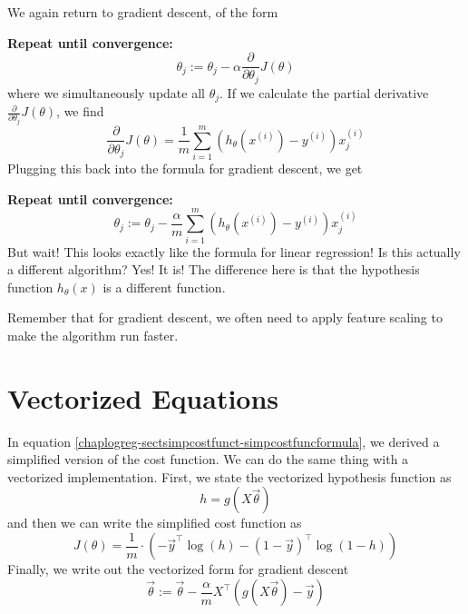 We again return to gradient descent, of the form 


\textbf{Repeat until convergence:}
\begin{equation}
\label{chaplogreg-sectcostfunct-subsectgraddscnt-logreggraddscnt}
\theta_j := \theta_j - \alpha \frac{\partial}{\partial \theta_j} J\left( \theta \right)
\end{equation}
where we simultaneously update all $\theta_j$. If we calculate the partial derivative $\frac{\partial}{\partial \theta_j} J\left(\theta\right)$, we find
\begin{equation}
\frac{\partial}{\partial \theta_j} J\left(\theta\right) = \frac{1}{m}\sum_{i=1}^m \left( h_\theta\left(x^{\left(i\right)}\right) - y^{\left(i\right)}\right) x_j^{\left(i\right)}
\end{equation}
Plugging this back into the formula for gradient descent, we get


\textbf{Repeat until convergence:}
\begin{equation}
\theta_j := \theta_j - \frac{\alpha}{m} \sum_{i=1}^m \left( h_\theta\left(x^{\left(i\right)}\right) - y^{\left(i\right)}\right) x_j^{\left(i\right)}
\end{equation}
But wait! This looks exactly like the formula for linear regression! Is this actually a different algorithm? Yes! It is! The difference here is that the hypothesis function $h_\theta\left(x\right)$ is a different function. 

Remember that for gradient descent, we often need to apply feature scaling to make the algorithm run faster. 


\section{Vectorized Equations}
In equation \ref{chaplogreg-sectsimpcostfunct-simpcostfuncformula}, we derived a simplified version of the cost function. We can do the same thing with a vectorized implementation. First, we state the vectorized hypothesis function as
\begin{equation}
h = g\left( X\vec{\theta}\right)
\end{equation}
and then we can write the simplified cost function as
\begin{equation}
J\left(\theta\right) = \frac{1}{m}\cdot \left( -\vec{y}^\intercal \log\left(h\right) - \left(1 - \vec{y}\right)^\intercal \log \left(1 - h\right)\right)
\end{equation}
Finally, we write out the vectorized form for gradient descent
\begin{equation}
\vec{\theta} := \vec{\theta} - \frac{\alpha}{m}X^\intercal \left( g\left(X\vec{\theta}\right) - \vec{y}\right)
\end{equation}

